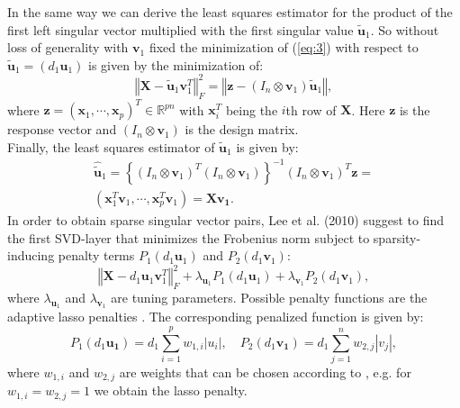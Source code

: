 In the same way we can derive the least squares estimator for the product of the first left singular vector multiplied with the first singular value $\mathbf{\tilde{u}}_{1}$. So without loss of generality with $\mathbf{v}_1$ fixed the minimization of (\ref{eq:3}) with respect to $\mathbf{\tilde{u}}_{1}=(d_{1}\mathbf{u}_{1})$ is given by the minimization of:
\begin{equation}
\left\Vert \mathbf{X} - \mathbf{\tilde{u}}_{1}\mathbf{v}_{1}^{T}\right\Vert_{F}^{2}=
\left\Vert \mathbf{z}-(I_{n}\otimes\mathbf{v}_{1})\mathbf{\tilde{u}}_{1}\right\Vert,
\label{eq:6}
\end{equation}
where $\mathbf{z}=(\mathbf{x}_{1},\cdots,\mathbf{x}_{p})^{T} \in \mathbb{R}^{pn}$ with $\mathbf{x}_{i}^{T}$ being the $i$th row of $\mathbf{X}$. Here $\mathbf{z}$ is the response vector and $(I_{n}\otimes\mathbf{v}_{1})$ is the design matrix.\\
Finally, the least squares estimator of $\mathbf{\tilde{u}}_{1}$ is given by:
\begin{equation}
\begin{split}
\mathbf{\hat{\tilde{u}}}_{1}=
\left\{(I_{n}\otimes\mathbf{v}_{1})^T(I_{n}\otimes\mathbf{v}_{1})\right\}^{-1}(I_{n}\otimes\mathbf{v}_{1})^T\mathbf{z}=\\
(\mathbf{x}_{1}^{T}\mathbf{v}_{1},\cdots,\mathbf{x}_{p}^{T}\mathbf{v}_{1})=\mathbf{X}\mathbf{v_{1}}.
\end{split}
\end{equation}
In order to obtain sparse singular vector pairs, Lee et al. (2010) suggest to find the first SVD-layer that minimizes the Frobenius norm subject to sparsity-inducing penalty terms $P_{1}(d_{1}\mathbf{u}_{1})$ and $P_{2}(d_{1}\mathbf{v}_{1})$:
\begin{equation} \left\Vert \mathbf{X} - d_{1}\mathbf{u}_{1}\mathbf{v}_{1}^{T}\right\Vert_{F}^{2} + \lambda_{\mathbf{u}_{1}}P_{1}(d_{1} \mathbf{u}_{1}) + \lambda_{\mathbf{v}_{1}}P_{2}(d_{1} \mathbf{v}_{1}),
\label{eq:8}
\end{equation}
where $\lambda_{\mathbf{u}_{1}}$ and $\lambda_{\mathbf{v}_{1}}$ are tuning parameters. Possible penalty functions are the adaptive lasso penalties \cite{Zou2006}. The corresponding penalized function is given by:
\begin{equation}
P_{1}(d_{1}\mathbf{u_{1}})=d_{1}\sum_{i=1}^{p}w_{1,i}|u_{i}|,\quad P_{2}(d_{1} \mathbf{v_{1}})=d_{1}\sum_{j=1}^{n}w_{2,j}|v_{j}|,
\end{equation}
where $w_{1,i}$ and $w_{2,j}$ are weights that can be chosen according to \citet{Zou2006}, e.g. for $w_{1,i}=w_{2,j}=1$ we obtain the lasso penalty.
